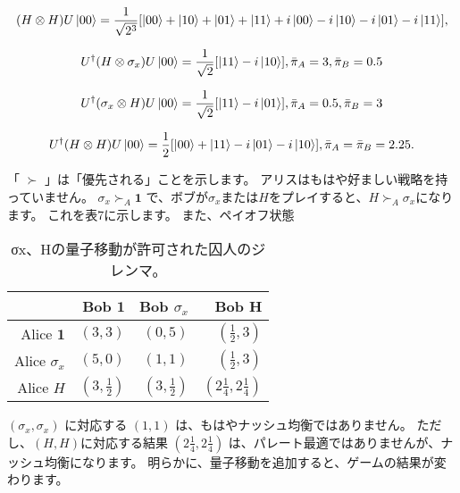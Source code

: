 \begin{equation}
\label{152}
(H \otimes H ) U \ket{00}
=
\frac{1}{\sqrt{2^3}}  [\ket{00} + \ket{10} + \ket{01}+ \ket{11} + i \ket{00} - i \ket{10} - i \ket{01} - i \ket{11} ],
\end{equation}

\begin{equation}
\label{153}
U^{\dagger}(H \otimes \sigma_x ) U \ket{00}
=
\frac{1}{\sqrt{2}}  [\ket{11}  - i \ket{10}], \bar{\pi}_A=3, \bar{\pi}_B=0.5
\end{equation}

\begin{equation}
\label{154}
U^{\dagger}(\sigma_x \otimes H) U \ket{00}
=
\frac{1}{\sqrt{2}}  [\ket{11}  - i \ket{01}], \bar{\pi}_A=0.5, \bar{\pi}_B=3
\end{equation}


\begin{equation}
\label{155}
U^{\dagger}(H \otimes H) U \ket{00}
=
\frac{1}{2}  [\ket{00}  +\ket{11} - i \ket{01}- i \ket{10}], \bar{\pi}_A= \bar{\pi}_B=2.25.
\end{equation}

「 $\succ$ 」は「優先される」ことを示します。 アリスはもはや好ましい戦略を持っていません。 
$\sigma_x  \succ_A \mathbf{1}$ で、ボブが$\sigma_x$または$H$をプレイすると、$H \succ_A \sigma_x$になります。 これを表7に示します。 また、ペイオフ状態 \\


\begin{table}[htb]
\caption{σx、Hの量子移動が許可された囚人のジレンマ。}
\centering
\begin{tabular}{|r|r|r|r|} \hline
 & Bob $\mathbf{1}$  & Bob $\sigma_x$ & Bob H \\ \hline
Alice $\mathbf{1}$ & $(3,3)$ & $(0,5)$ & $(\frac{1}{2},3)$  \\
Alice $\sigma_x$ & $(5,0)$ & $(1,1)$ & $(\frac{1}{2},3)$ \\ 
Alice $H$ & $(3,\frac{1}{2})$ & $(3,\frac{1}{2})$ & $(2 \frac{1}{4},2 \frac{1}{4})$ \\ \hline
\end{tabular}
\end{table} 


$( \sigma_x, \sigma_x)$ に対応する $(1,1)$ は、もはやナッシュ均衡ではありません。
ただし、$(H, H)$に対応する結果 $(2 \frac{1}{4},2 \frac{1}{4})$  は、パレート最適ではありませんが、ナッシュ均衡になります。 明らかに、量子移動を追加すると、ゲームの結果が変わります。


